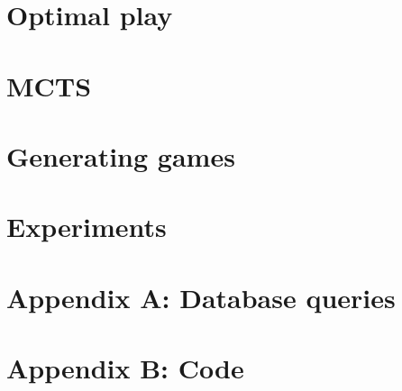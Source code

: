 \documentclass[12pt]{article}
\begin{document}
\section{Optimal play}
\label{sec:optimal_play}


\section{MCTS}
\label{sec:mcts}


\section{Generating games}
\label{sec:generating_games}


\section{Experiments}
\label{sec:experiments}


\section{Appendix A: Database queries}
\label{sec:database_queries}


\section{Appendix B: Code}
\label{sec:code}


% 



\end{document}
